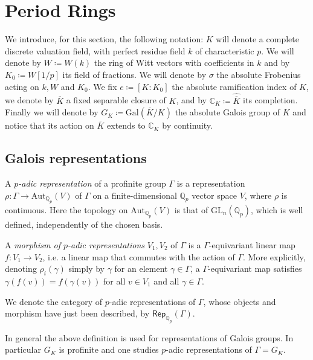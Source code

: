 \section{Period Rings}
We introduce, for this section, the following notation:
$K$ will denote a complete discrete valuation field, 
with perfect residue field $k$ of characteristic $p$.
We will denote by $W \coloneqq W(k)$ the ring of Witt vectors with coefficients in $k$
and by $K_0 \coloneqq W[1/p]$ its field of fractions.
We will denote by $\sigma$ the absolute Frobenius acting
on $k, W$ and $K_0$.
We fix $e \coloneqq [ K : K_0 ]$ the absolute ramification index of $K$,
we denote by $\overline{K}$ a fixed separable closure of $K$,
and by $\mathbb{C}_K \coloneqq \widehat{\overline{K}}$ its completion.
Finally we will denote by $G_K \coloneqq \mathrm{Gal}\left( \overline{K} / K \right)$ 
the absolute Galois group of $K$ and notice that its action on $\overline{K}$
extends to $\mathbb{C}_K$ by continuity.



\subsection{Galois representations}
\begin{defn}
	A {\em $p$-adic representation} of a profinite group $\Gamma$ is a
	representation $\rho\colon \Gamma \to \mathrm{Aut}_{\mathbb{Q}_p}(V)$
	of $\Gamma$ on a finite-dimensional $\mathbb{Q}_p$ vector space
	$V$, where $\rho$ is continuous.
	Here the topology on $\mathrm{Aut}_{\mathbb{Q}_p}(V)$ is
	that of $\mathrm{GL}_n(\mathbb{Q}_p)$, which is well defined,
	independently of the chosen basis.

	A {\em morphism of $p$-adic representations} $V_1, V_2$ of $\Gamma$
	is a $\Gamma$-equivariant linear map $f\colon V_1 \to V_2$, 
	i.e. a linear map that commutes with the action of $\Gamma$.
	More explicitly, denoting $\rho_i(\gamma)$ simply by $\gamma$ for
	an element $\gamma \in \Gamma$, a $\Gamma$-equivariant
	map satisfies $\gamma(f(v)) = f(\gamma(v))$
	for all $v \in V_1$ and all $\gamma \in \Gamma$.

	We denote the category of $p$-adic representations of $\Gamma$,
	whose objects and morphism have just been described,
	by $\mathsf{Rep}_{\mathbb{Q}_p}(\Gamma)$.
\end{defn}


\begin{rem}[]
	In general the above definition is used for representations of Galois groups.
	In particular $G_K$ is profinite and one studies $p$-adic representations of $\Gamma = G_K$.
\end{rem}


